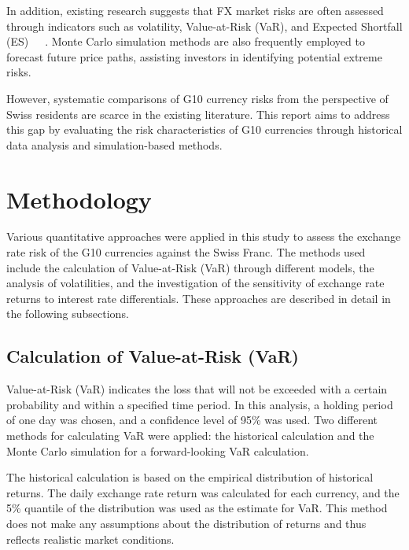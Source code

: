 \documentclass[a4paper, 12pt]{article}
\begin{document}
In addition, existing research suggests that FX market risks are often assessed through indicators such as volatility, Value-at-Risk (VaR), and Expected Shortfall (ES)~\cite{AUBOIN_RUTA_2013}~\cite{dollar_exchange}~\cite{riker2020review}. Monte Carlo simulation methods are also frequently employed to forecast future price paths, assisting investors in identifying potential extreme risks.

However, systematic comparisons of G10 currency risks from the perspective of Swiss residents are scarce in the existing literature. This report aims to address this gap by evaluating the risk characteristics of G10 currencies through historical data analysis and simulation-based methods.

\section{Methodology}

Various quantitative approaches were applied in this study to assess the exchange rate risk of the G10 currencies against the Swiss Franc. The methods used include the calculation of Value-at-Risk (VaR) through different models, the analysis of volatilities, and the investigation of the sensitivity of exchange rate returns to interest rate differentials. These approaches are described in detail in the following subsections.

\subsection{Calculation of Value-at-Risk (VaR)}

Value-at-Risk (VaR) indicates the loss that will not be exceeded with a certain probability and within a specified time period. In this analysis, a holding period of one day was chosen, and a confidence level of 95\% was used. Two different methods for calculating VaR were applied: the historical calculation and the Monte Carlo simulation for a forward-looking VaR calculation.

The historical calculation is based on the empirical distribution of historical returns. The daily exchange rate return was calculated for each currency, and the 5\% quantile of the distribution was used as the estimate for VaR. This method does not make any assumptions about the distribution of returns and thus reflects realistic market conditions.
\end{document}
